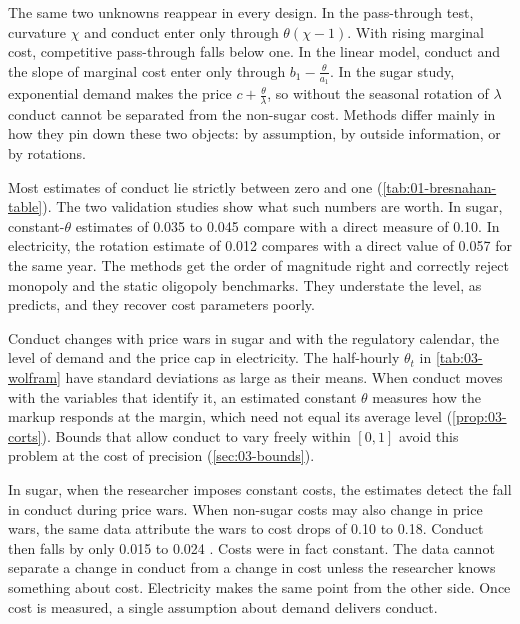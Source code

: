 The same two unknowns reappear in every design. In the pass-through test, curvature $\chi$ and conduct enter only
through $\theta(\chi - 1)$. With rising marginal cost, competitive pass-through falls below one. In the linear model,
conduct and the slope of marginal cost enter only through $b_1 - \frac{\theta}{a_1}$. In the sugar study, exponential
demand makes the price $c + \frac{\theta}{\lambda}$, so without the seasonal rotation of $\lambda$ conduct cannot be
separated from the non-sugar cost. Methods differ mainly in how they pin
down these two objects: by assumption, by outside information, or by rotations.

Most estimates of conduct lie strictly between zero and one (\cref{tab:01-bresnahan-table}). The two validation studies
show what such numbers are worth. In sugar, constant-$\theta$ estimates of 0.035 to 0.045 compare with a direct measure
of 0.10. In electricity, the rotation estimate of 0.012 compares with a direct value of 0.057 for the same year. The
methods get the order of magnitude right and correctly reject monopoly and the
static oligopoly benchmarks. They understate the level, as \citet{Corts1999} predicts, and they recover cost parameters
poorly.

Conduct changes with price wars in sugar and with the regulatory calendar, the level of demand and the price cap in
electricity. The half-hourly $\theta_t$ in \cref{tab:03-wolfram} have standard deviations as large as their means. When
conduct moves with the variables that identify it, an estimated constant $\theta$ measures how the markup responds at
the margin, which need not equal its average level (\cref{prop:03-corts}). Bounds that allow conduct to vary freely within $[0, 1]$ avoid
this problem at the cost of precision (\cref{sec:03-bounds}).

In sugar, when the researcher imposes constant costs, the estimates detect the fall in conduct during price wars. When
non-sugar costs may also change in price wars, the same data attribute the wars to cost drops of 0.10 to 0.18. Conduct
then falls by only 0.015 to 0.024 \citep[Table~15]{GenesoveMullin1995}. Costs were in fact constant. The data cannot
separate a change in conduct from a change in cost unless the researcher knows something about cost. Electricity makes
the same point from the other side. Once cost is measured, a single assumption about demand delivers conduct.

